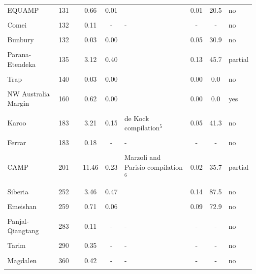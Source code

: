 \documentclass[11pt,letterpaper]{article}
\begin{document}
\begin{table}[h!]
{\begin{tabular}{lc>{\raggedright}p{4cm}cc>{\raggedright}p{4cm}ccl}
EQUAMP & 131 & \cite{Hollanda2016a} & 0.66 & 0.01 & \cite{Hollanda2016a} & 0.01 & 20.5 & no \\
 & & & & & & & & \\
Comei & 132 & \cite{Zhu2009a} & 0.11 & - & - & - & - & no \\
 & & & & & & & & \\
Bunbury & 132 & \cite{Zhu2009a} & 0.03 & 0.00 & \cite{Thorne2014a} & 0.05 & 30.9 & no \\
 & & & & & & & & \\
Parana-Etendeka & 135 & \cite{Florisbal2014a, Almeida2018a} & 3.12 & 0.40 & \cite{Coffin2006a} & 0.13 & 45.7 & partial \\
 & & & & & & & & \\
Trap & 140 & \cite{Ernst2001a} & 0.03 & 0.00 & \cite{Ernst2001a} & 0.00 & 0.0 & no \\
 & & & & & & & & \\
NW Australia Margin & 160 & \cite{Pirajno2012a} & 0.62 & 0.00 & \cite{Coffin2006a} & 0.00 & 0.0 & yes \\
 & & & & & & & & \\
Karoo & 183 & \cite{Burgess2015a} & 3.21 & 0.15 & de Kock compilation$^{5}$ & 0.05 & 41.3 & no \\
 & & & & & & & & \\
Ferrar & 183 & \cite{Burgess2015a} & 0.18 & - & - & - & - & no \\
 & & & & & & & & \\
CAMP & 201 & \cite{Blackburn2013a} & 11.46 & 0.23 & Marzoli and Parisio compilation$^{6}$ & 0.02 & 35.7 & partial \\
 & & & & & & & & \\
Siberia & 252 & \cite{Burgess2015b} & 3.46 & 0.47 & \cite{Coffin2006a} & 0.14 & 87.5 & no \\
 & & & & & & & & \\
Emeishan & 259 & \cite{Zhou2002a} & 0.71 & 0.06 & \cite{Coffin2006a} & 0.09 & 72.9 & no \\
 & & & & & & & & \\
Panjal-Qiangtang & 283 & \cite{Zhai2013a} & 0.11 & - & - & - & - & no \\
 & & & & & & & & \\
Tarim & 290 & \cite{Xu2014a} & 0.35 & - & - & - & - & no \\
 & & & & & & & & \\
Magdalen & 360 & \cite{Murphy1999a} & 0.42 & - & - & - & - & no \\
 & & & & & & & & \\

\end{tabular}}
\end{table}
\end{document}
